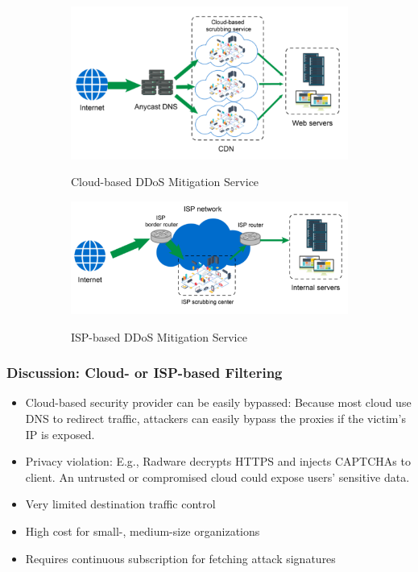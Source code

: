 \documentclass[11pt,oneside,a4paper]{article}
\begin{document}
\begin{figure}[b!]
	\centering
	\begin{subfigure}[t]{.5\textwidth}
		\centering
		\includegraphics[width=0.7\linewidth]{figures/ddos_cloud_mitigation}
		\label{fig:ddos_cloud_mitigation}
		\caption{Cloud-based DDoS Mitigation Service}
	\end{subfigure}%
	\begin{subfigure}[t]{.5\textwidth}
		\centering
		\includegraphics[width=0.9\linewidth]{figures/ddos_isp_mitigation}
		\label{fig:ddos_isp_mitigation}
		\caption{ISP-based DDoS Mitigation Service}
	\end{subfigure}
	\caption{}
\end{figure}

\subsubsection{Discussion: Cloud- or ISP-based Filtering}

\begin{itemize}
	\setlength{\itemsep}{0pt}
	\setlength{\parskip}{0pt}
	\item Cloud-based security provider can be easily bypassed: Because most cloud use DNS to redirect traffic, attackers can easily bypass the proxies if the victim’s IP is exposed.
	\item Privacy violation: E.g., Radware decrypts HTTPS and injects CAPTCHAs to client. An untrusted or compromised cloud could expose users’ sensitive data.
	\item Very limited destination traffic control
	\item High cost for small-, medium-size organizations
	\item Requires continuous subscription for fetching attack signatures
\end{itemize}
\vspace{-\topsep}
\end{document}

